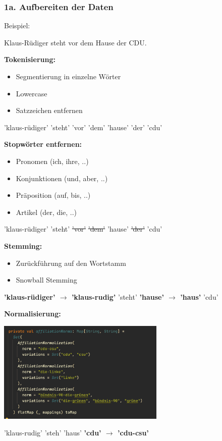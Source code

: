 \documentclass{beamer}
\begin{document}
\begin{frame}[allowframebreaks]
  \frametitle{1a. Aufbereiten der Daten}

  Beispiel:

  Klaus-Rüdiger steht vor dem Hause der CDU.

  \break

  \textbf{Tokenisierung:}

  \begin{itemize}
    \item Segmentierung in einzelne Wörter
    \item Lowercase
    \item Satzzeichen entfernen
  \end{itemize}

  \bigskip
  'klaus-rüdiger' 'steht' 'vor' 'dem' 'hause' 'der' 'cdu'

  \break

  \textbf{Stopwörter entfernen:}

  \medskip

  {\scriptsize
    \begin{itemize}
      \item Pronomen (ich, ihre, ..)
      \item Konjunktionen (und, aber, ..)
      \item Präposition (auf, bis, ..)
      \item Artikel (der, die, ..)
    \end{itemize}
  }

  \bigskip

  'klaus-rüdiger' 'steht' \sout{'vor'} \sout{'dem'} 'hause' \sout{'der'} 'cdu'

  \break

  \textbf{Stemming:}

  \bigskip

  \begin{itemize}
    \item Zurückführung auf den Wortstamm
    \item Snowball Stemming
  \end{itemize}

  \bigskip

  \textbf{'klaus-rüdiger' $\rightarrow$ 'klaus-rudig'} 'steht' \textbf{'hause' $\rightarrow$ 'haus'} 'cdu'

  \break

  \textbf{Normalisierung:}

  \includegraphics[width=8cm]{normalisierung}

  \bigskip

  'klaus-rudig' 'steh' 'haus' \textbf{'cdu' $\rightarrow$ 'cdu-csu'}
\end{frame}
\end{document}
